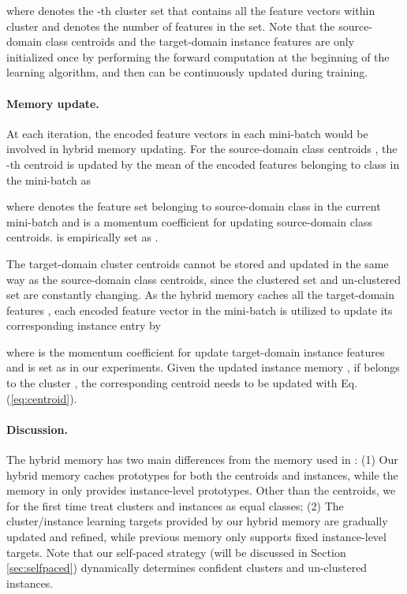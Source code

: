 \documentclass{article}
\begin{document}
where  denotes the -th cluster set that contains all the feature vectors within cluster  and  denotes the number of features in the set.
Note that the source-domain class centroids  and the target-domain instance features  are only initialized once by performing the forward computation at the beginning of the learning algorithm, and then can be continuously updated during training.


\vspace{-5pt}
\paragraph{Memory update.} 
At each iteration, 
the encoded feature vectors in each mini-batch would be involved in hybrid memory updating. 
For the source-domain class centroids , the -th centroid  is updated by the mean of the encoded features belonging to class  in the mini-batch as

where  denotes the feature set belonging to source-domain class  in the current mini-batch and  is a momentum coefficient for updating source-domain class centroids.  is empirically set as .



The target-domain cluster centroids cannot be stored and updated in the same way as the source-domain class centroids, since the clustered set  and un-clustered set  are constantly changing. 
As the hybrid memory caches all the target-domain features , each encoded feature vector  in the mini-batch is utilized to update its corresponding instance entry  by

where  is the momentum coefficient for update target-domain instance features and is set as  in our experiments.
Given the updated instance memory , 
if  belongs to the cluster ,
the corresponding centroid  needs to be updated with Eq. (\ref{eq:centroid}).







\vspace{-5pt}
\paragraph{Discussion.}
The hybrid memory has two main differences from the memory used in \cite{wu2018unsupervised,he2019momentum}:
(1) Our hybrid memory caches prototypes for both the centroids and instances, while the memory in \cite{wu2018unsupervised,he2019momentum} only provides instance-level prototypes. Other than the centroids, we for the first time treat clusters and instances as equal classes;
(2) The cluster/instance learning targets provided by our hybrid memory are gradually updated and refined, while previous memory \cite{wu2018unsupervised,he2019momentum} only supports fixed instance-level targets. Note that our self-paced strategy (will be discussed in Section \ref{sec:selfpaced}) dynamically determines confident clusters and un-clustered instances.
\end{document}
